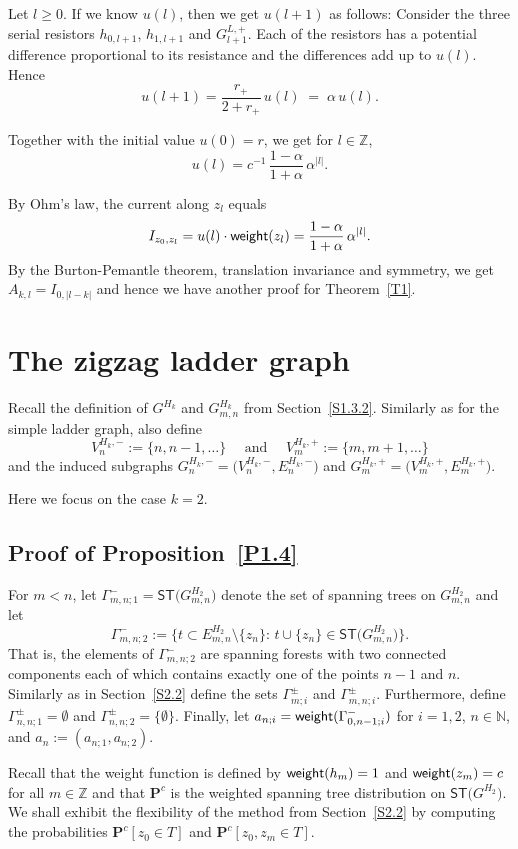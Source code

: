 \documentclass[11pt]{article}
\providecommand{\1}{\mathBB{1}}
\newcommand{\mbu}{\quad\mbox{ and }\quad}
\renewcommand{\P}{\mathbf{P}}
\newcommand{\N}{{\mathbb{N}}}
\newcommand{\Z}{{\mathbb{Z}}}
\def\SPT{\mathsf{ST}}
\newcommand{\Section}[1]{\section{#1}\setcounter{figure}{0}\setcounter{table}{0}\setcounter{equation}{0}}
\newcommand{\weight}{\mathop{\mbox{\sf weight}}}
\begin{document}
Let $l\geq0$. If we know $u(l)$, then we get $u(l+1)$ as follows: Consider the three serial resistors $h_{0,l+1}$, $h_{1,l+1}$ and $G^{L,+}_{l+1}$. Each of the resistors has a potential difference proportional to its resistance and the differences add up to $u(l)$. Hence
$$u(l+1)=\frac{r_+}{2+r_+}\,u(l)\;=\;\alpha\,u(l).$$

Together with the initial value $u(0)=r$, we get for $l\in\Z$,
$$u(l)=c^{-1}\,\frac{1-\alpha}{1+\alpha}\,\alpha^{|l|}.$$

By Ohm's law, the current along $z_l$ equals
$$I_{z_0,z_l}=u(l)\cdot\weight(z_l)=\frac{1-\alpha}{1+\alpha}\,\alpha^{|l|}.$$
By the Burton-Pemantle theorem, translation invariance and symmetry, we get $A_{k,l}=I_{0,|l-k|}$ and hence we have another proof for Theorem~\ref{T1}.

\Section{The zigzag ladder graph}
\label{S3}
Recall the definition of $G^{H_k}$ and $G^{H_k}_{m,n}$ from Section~\ref{S1.3.2}. Similarly as for the simple ladder graph, also define
$$V^{H_k,-}_n:=\big\{n,n-1,\ldots\big\}\mbu V^{H_k,+}_m:=\big\{m,m+1,\ldots\big\}$$
 and the induced subgraphs $G^{H_k,-}_{n}=\big(V^{H_k,-}_n, E^{H_k,-}_n\big)$  and $G^{H_k,+}_{m}=\big(V^{H_k,+}_m, E^{H_k,+}_m\big)$.

Here we focus on the case $k=2$.


\subsection{Proof of Proposition~\ref{P1.4}}
\label{S3.1}
For $m<n$, let $\Gamma^-_{m,n;1}=\SPT\big(G^{H_2}_{m,n}\big)$ denote the set of spanning trees on $G^{H_2}_{m,n}$ and let
$$\Gamma^-_{m,n;2}:=\Big\{t\subset E^{H_2}_{m,n}\setminus\{z_n\}:\,t\cup\{z_n\}\in\SPT\big(G^{H_2}_{m,n}\big)\Big\}.$$
That is, the elements of $\Gamma^-_{m,n;2}$ are spanning forests with two connected components each of which contains exactly one of the points $n-1$ and $n$. Similarly as in Section~\ref{S2.2} define the sets $\Gamma^\pm_{m;i}$ and $\Gamma^\pm_{m,n;i}$. Furthermore, define $\Gamma^\pm_{n,n;1}=\emptyset$ and $\Gamma^\pm_{n,n;2}=\{\emptyset\}$. Finally, let $a_{n;i}=\weight(\Gamma^-_{0,n-1;i})$ for $i=1,2$, $n\in\N$, and $a_n:=(a_{n;1},a_{n;2})$.

Recall that the weight function is defined by $\weight(h_m)=1$ and $\weight(z_m)=c$ for all $m\in\Z$ and that $\P^c$ is the weighted spanning tree distribution on $\SPT\big(G^{H_2}\big)$. We shall exhibit the flexibility of the method from Section~\ref{S2.2} by computing the probabilities $\P^c[z_0\in T]$ and $\P^c[z_0,z_m\in T]$.
\end{document}

